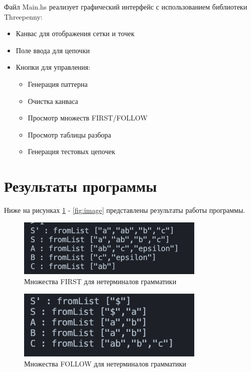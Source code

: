 \documentclass[areasetadvanced]{scrartcl}
\begin{document}
Файл Main.hs реализует графический интерфейс с использованием библиотеки Threepenny:
\begin{itemize}
  \item Канвас для отображения сетки и точек
  \item Поле ввода для цепочки
  \item Кнопки для управления:
    \begin{itemize}
      \item Генерация паттерна
      \item Очистка канваса
      \item Просмотр множеств FIRST/FOLLOW
      \item Просмотр таблицы разбора
      \item Генерация тестовых цепочек
    \end{itemize}
\end{itemize}

\newpage
\section{Результаты программы}
Ниже на рисунках \ref{fig:first} - \ref{fig:image} представлены результаты работы программы.

\begin{figure}[H]
  \centering
  \includegraphics[width=0.8\textwidth]{images/FIRST.png}
  \caption{Множества FIRST для нетерминалов грамматики}
  \label{fig:first}
\end{figure}

\begin{figure}[h]
  \centering
  \includegraphics[width=0.8\textwidth]{images/FOLLOW.png}
  \caption{Множества FOLLOW для нетерминалов грамматики}
  \label{fig:follow}
\end{figure}
\end{document}
